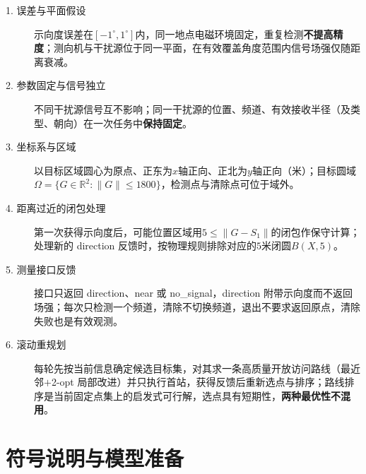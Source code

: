 \documentclass[withoutpreface]{cumcmthesis}
\begin{document}
\begin{description}
\item[1. 误差与平面假设] 示向度误差在$[-1^\circ,1^\circ]$内，同一地点电磁环境固定，重复检测\textbf{不提高精度}；测向机与干扰源位于同一平面，在有效覆盖角度范围内信号场强仅随距离衰减。
\item[2. 参数固定与信号独立] 不同干扰源信号互不影响；同一干扰源的位置、频道、有效接收半径（及类型、朝向）在一次任务中\textbf{保持固定}。
\item[3. 坐标系与区域] 以目标区域圆心为原点、正东为$x$轴正向、正北为$y$轴正向（米）；目标圆域$\Omega=\{G\in\mathbb R^2:\|G\|\leq1800\}$，检测点与清除点可位于域外。
\item[4. 距离过近的闭包处理] 第一次获得示向度后，可能位置区域用$5\le\|G-S_1\|$的闭包作保守计算；处理新的 direction 反馈时，按物理规则排除对应的$5$米闭圆$B(X,5)$。
\item[5. 测量接口反馈] 接口只返回 direction、near 或 no\_signal，direction 附带示向度而不返回场强；每次只检测一个频道，清除不切换频道，退出不要求返回原点，清除失败也是有效观测。
\item[6. 滚动重规划] 每轮先按当前信息确定候选目标集，对其求一条高质量开放访问路线（最近邻$+$2-opt 局部改进）并只执行首站，获得反馈后重新选点与排序；路线排序是当前固定点集上的启发式可行解，选点具有短期性，\textbf{两种最优性不混用}。
\end{description}

\section{符号说明与模型准备}
\end{document}
